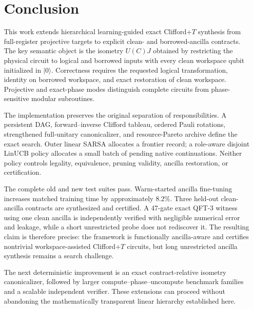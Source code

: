 \section{Conclusion}

This work extends hierarchical learning-guided exact Clifford+$T$ synthesis from full-register projective targets to explicit clean- and borrowed-ancilla contracts. The key semantic object is the isometry $U(C)J$ obtained by restricting the physical circuit to logical and borrowed inputs with every clean workspace qubit initialized in $\lvert0\rangle$. Correctness requires the requested logical transformation, identity on borrowed workspace, and exact restoration of clean workspace. Projective and exact-phase modes distinguish complete circuits from phase-sensitive modular subroutines.

The implementation preserves the original separation of responsibilities. A persistent DAG, forward--inverse Clifford tableau, ordered Pauli rotations, strengthened full-unitary canonicalizer, and resource-Pareto archive define the exact search. Outer linear SARSA allocates a frontier record; a role-aware disjoint LinUCB policy allocates a small batch of pending native continuations. Neither policy controls legality, equivalence, pruning validity, ancilla restoration, or certification.

The complete old and new test suites pass. Warm-started ancilla fine-tuning increases matched training time by approximately $8.2\%$. Three held-out clean-ancilla contracts are synthesized and certified. A 47-gate exact QFT-3 witness using one clean ancilla is independently verified with negligible numerical error and leakage, while a short unrestricted probe does not rediscover it. The resulting claim is therefore precise: the framework is functionally ancilla-aware and certifies nontrivial workspace-assisted Clifford+$T$ circuits, but long unrestricted ancilla synthesis remains a search challenge.

The next deterministic improvement is an exact contract-relative isometry canonicalizer, followed by larger compute--phase--uncompute benchmark families and a scalable independent verifier. These extensions can proceed without abandoning the mathematically transparent linear hierarchy established here.
